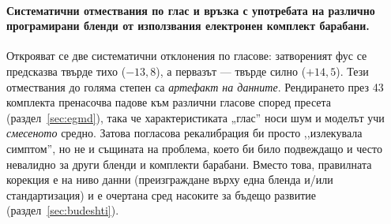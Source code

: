 \paragraph{Систематични отмествания по глас и връзка с употребата на различно програмирани бленди
от използвания електронен комплект барабани.}
Открояват се две систематични отклонения по гласове: затвореният фус се предсказва
твърде тихо ($-13{,}8$), а первазът — твърде силно ($+14{,}5$). Тези
отмествания до голяма степен са \emph{артефакт на данните}. Рендирането през 43
комплекта пренасочва падове към различни гласове според пресета
(раздел~\ref{sec:egmd}), така че характеристиката „глас'' носи шум и моделът учи
\emph{смесеното} средно. Затова погласова рекалибрация би просто ,,излекувала симптом'',
но не и същината на проблема, което би било подвеждащо и често невалидно за други бленди и комплекти
барабани. Вместо това,
правилната корекция е на ниво данни (преизграждане върху една бленда и/или стандартизация) и е
очертана сред насоките за бъдещо развитие (раздел~\ref{sec:budeshti}).
